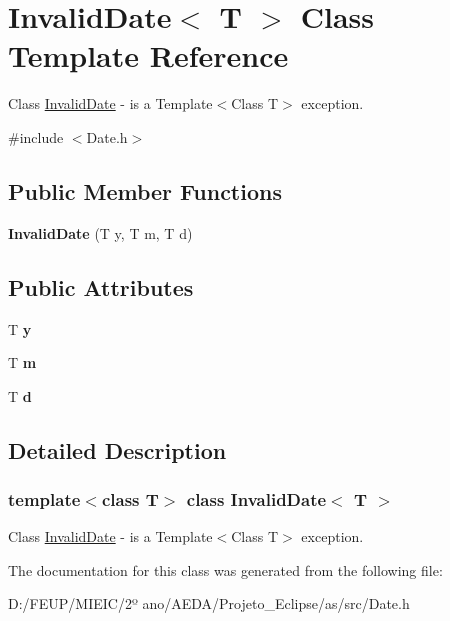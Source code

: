 \hypertarget{class_invalid_date}{}\section{Invalid\+Date$<$ T $>$ Class Template Reference}
\label{class_invalid_date}


Class \hyperlink{class_invalid_date}{Invalid\+Date} -\/ is a Template$<$\+Class T$>$ exception.  




{\ttfamily \#include $<$Date.\+h$>$}

\subsection*{Public Member Functions}
\begin{DoxyCompactItemize}
\item 
\mbox{\label{class_invalid_date_a3fbe382d9f0ecc3c5b5bef64a0785877}} 
{\bfseries Invalid\+Date} (T y, T m, T d)
\end{DoxyCompactItemize}
\subsection*{Public Attributes}
\begin{DoxyCompactItemize}
\item 
\mbox{\label{class_invalid_date_a1276ebe79fcc1f25434ab418f6574aa6}} 
T {\bfseries y}
\item 
\mbox{\label{class_invalid_date_a662c67e855454c7b3b5f334e711b41a2}} 
T {\bfseries m}
\item 
\mbox{\label{class_invalid_date_a902305bd651bb3e30d6e7c2cd5d1f247}} 
T {\bfseries d}
\end{DoxyCompactItemize}


\subsection{Detailed Description}
\subsubsection*{template$<$class T$>$\newline
class Invalid\+Date$<$ T $>$}

Class \hyperlink{class_invalid_date}{Invalid\+Date} -\/ is a Template$<$\+Class T$>$ exception. 

The documentation for this class was generated from the following file\+:\begin{DoxyCompactItemize}
\item 
D\+:/\+F\+E\+U\+P/\+M\+I\+E\+I\+C/2º ano/\+A\+E\+D\+A/\+Projeto\+\_\+\+Eclipse/as/src/Date.\+h\end{DoxyCompactItemize}
